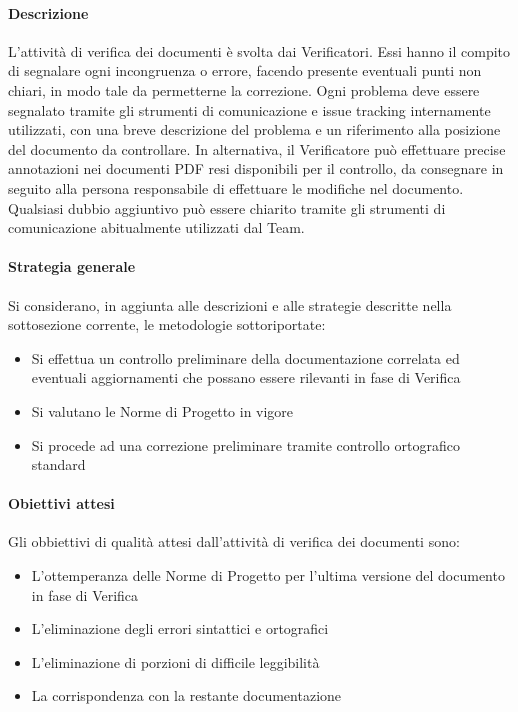		\paragraph{Descrizione}
		L'attività di verifica dei documenti è svolta dai Verificatori. Essi hanno il compito di segnalare ogni incongruenza o errore, facendo presente eventuali punti non chiari, in modo tale da permetterne la correzione. Ogni problema deve essere segnalato tramite gli strumenti di comunicazione e issue tracking internamente utilizzati, con una breve descrizione del problema e un riferimento alla posizione del documento da controllare. In alternativa, il Verificatore può effettuare precise annotazioni nei documenti PDF resi disponibili per il controllo, da consegnare in seguito alla persona responsabile di effettuare le modifiche nel documento.\\
		Qualsiasi dubbio aggiuntivo può essere chiarito tramite gli strumenti di comunicazione abitualmente utilizzati dal Team.
		
		\paragraph{Strategia generale}
		Si considerano, in aggiunta alle descrizioni e alle strategie descritte nella sottosezione corrente, le metodologie sottoriportate:
		
		\begin{itemize}
			\item Si effettua un controllo preliminare della documentazione correlata ed eventuali aggiornamenti che possano essere rilevanti in fase di Verifica
			\item Si valutano le Norme di Progetto in vigore
			\item Si procede ad una correzione preliminare tramite controllo ortografico standard
		\end{itemize}
	
		\paragraph{Obiettivi attesi}
		Gli obbiettivi di qualità attesi dall'attività di verifica dei documenti sono:
		
		\begin{itemize}
			\item L'ottemperanza delle Norme di Progetto per l'ultima versione del documento in fase di Verifica
			\item L'eliminazione degli errori sintattici e ortografici
			\item L'eliminazione di porzioni di difficile leggibilità
			\item La corrispondenza con la restante documentazione
		\end{itemize}
				
